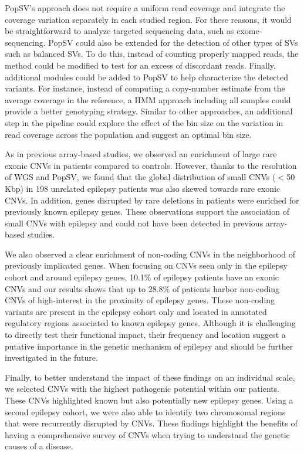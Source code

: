 {\sf PopSV}'s approach does not require a uniform read coverage and integrate the coverage variation separately in each studied region.
For these reasons, it would be straightforward to analyze targeted sequencing data, such as exome-sequencing.
{\sf PopSV} could also be extended for the detection of other types of SVs such as balanced SVs.
To do this, instead of counting properly mapped reads, the method could be modified to test for an excess of discordant reads.
Finally, additional modules could be added to {\sf PopSV} to help characterize the detected variants.
For instance, instead of computing a copy-number estimate from the average coverage in the reference, a HMM approach including all samples could provide a better genotyping strategy.
Similar to other approaches\cite{Abyzov2011,Benjamini2012}, an additional step in the pipeline could explore the effect of the bin size on the variation in read coverage across the population and suggest an optimal bin size.

As in previous array-based studies\cite{Mefford2011,Heinzen2010,Striano2012}, we observed an enrichment of large rare exonic CNVs in patients compared to controls.
However, thanks to the resolution of WGS and {\sf PopSV}, we found that the global distribution of small CNVs ($<$50 Kbp) in 198 unrelated epilepsy patients was also skewed towards rare exonic CNVs.
In addition, genes disrupted by rare deletions in patients were enriched for previously known epilepsy genes.
These observations support the association of small CNVs with epilepsy and could not have been detected in previous array-based studies.

We also observed a clear enrichment of non-coding CNVs in the neighborhood of previously implicated genes.
When focusing on CNVs seen only in the epilepsy cohort and around epilepsy genes, 10.1\% of epilepsy patients have an exonic CNVs and our results shows that up to 28.8\% of patients harbor non-coding CNVs of high-interest in the proximity of epilepsy genes.
These non-coding variants are present in the epilepsy cohort only and located in annotated regulatory regions associated to known epilepsy genes.
Although it is challenging to directly test their functional impact, their frequency and location suggest a putative importance in the genetic mechanism of epilepsy and should be further investigated in the future.

Finally, to better understand the impact of these findings on an individual scale, we selected CNVs with the highest pathogenic potential within our patients.
These CNVs highlighted known but also potentially new epilepsy genes.
Using a second epilepsy cohort, we were also able to identify two chromosomal regions that were recurrently disrupted by CNVs.
These findings highlight the benefits of having a comprehensive survey of CNVs when trying to understand the genetic causes of a disease.


